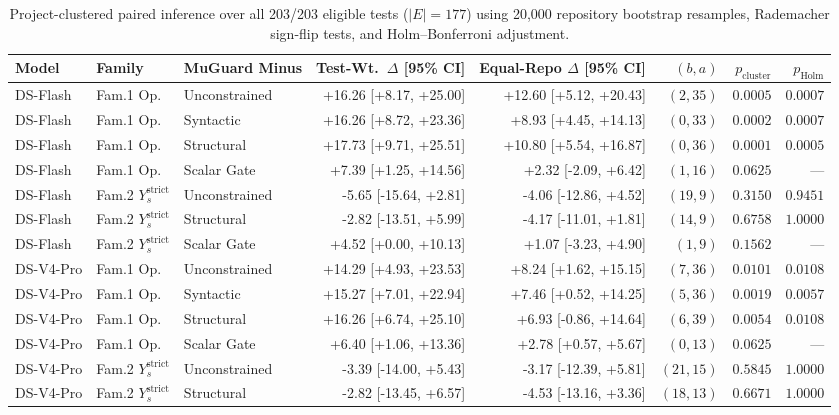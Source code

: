 \begin{table}[t]
\centering
\scriptsize
\setlength{\tabcolsep}{2.1pt}
\caption{Project-clustered paired inference over all 203/203 eligible tests ($|E|=177$) using 20,000 repository bootstrap resamples, Rademacher sign-flip tests, and Holm--Bonferroni adjustment.}
\label{tab:stat_tests}
\begin{tabular}{lllrrrrr}
\toprule
Model & Family & MuGuard Minus & Test-Wt.\ $\Delta$ [95\% CI] & Equal-Repo $\Delta$ [95\% CI] & $(b, a)$ & $p_{\text{cluster}}$ & $p_{\text{Holm}}$ \\
\midrule
DS-Flash & Fam.1 Op. & Unconstrained & +16.26 [+8.17, +25.00] & +12.60 [+5.12, +20.43] & $(2,35)$ & $0.0005$ & $0.0007$ \\
DS-Flash & Fam.1 Op. & Syntactic & +16.26 [+8.72, +23.36] & +8.93 [+4.45, +14.13] & $(0,33)$ & $0.0002$ & $0.0007$ \\
DS-Flash & Fam.1 Op. & Structural & +17.73 [+9.71, +25.51] & +10.80 [+5.54, +16.87] & $(0,36)$ & $0.0001$ & $0.0005$ \\
DS-Flash & Fam.1 Op. & Scalar Gate & +7.39 [+1.25, +14.56] & +2.32 [-2.09, +6.42] & $(1,16)$ & $0.0625$ & --- \\
DS-Flash & Fam.2 $Y_s^{\text{strict}}$ & Unconstrained & -5.65 [-15.64, +2.81] & -4.06 [-12.86, +4.52] & $(19,9)$ & $0.3150$ & $0.9451$ \\
DS-Flash & Fam.2 $Y_s^{\text{strict}}$ & Structural & -2.82 [-13.51, +5.99] & -4.17 [-11.01, +1.81] & $(14,9)$ & $0.6758$ & $1.0000$ \\
DS-Flash & Fam.2 $Y_s^{\text{strict}}$ & Scalar Gate & +4.52 [+0.00, +10.13] & +1.07 [-3.23, +4.90] & $(1,9)$ & $0.1562$ & --- \\
\midrule
DS-V4-Pro & Fam.1 Op. & Unconstrained & +14.29 [+4.93, +23.53] & +8.24 [+1.62, +15.15] & $(7,36)$ & $0.0101$ & $0.0108$ \\
DS-V4-Pro & Fam.1 Op. & Syntactic & +15.27 [+7.01, +22.94] & +7.46 [+0.52, +14.25] & $(5,36)$ & $0.0019$ & $0.0057$ \\
DS-V4-Pro & Fam.1 Op. & Structural & +16.26 [+6.74, +25.10] & +6.93 [-0.86, +14.64] & $(6,39)$ & $0.0054$ & $0.0108$ \\
DS-V4-Pro & Fam.1 Op. & Scalar Gate & +6.40 [+1.06, +13.36] & +2.78 [+0.57, +5.67] & $(0,13)$ & $0.0625$ & --- \\
DS-V4-Pro & Fam.2 $Y_s^{\text{strict}}$ & Unconstrained & -3.39 [-14.00, +5.43] & -3.17 [-12.39, +5.81] & $(21,15)$ & $0.5845$ & $1.0000$ \\
DS-V4-Pro & Fam.2 $Y_s^{\text{strict}}$ & Structural & -2.82 [-13.45, +6.57] & -4.53 [-13.16, +3.36] & $(18,13)$ & $0.6671$ & $1.0000$ \\

\end{tabular}
\end{table}
